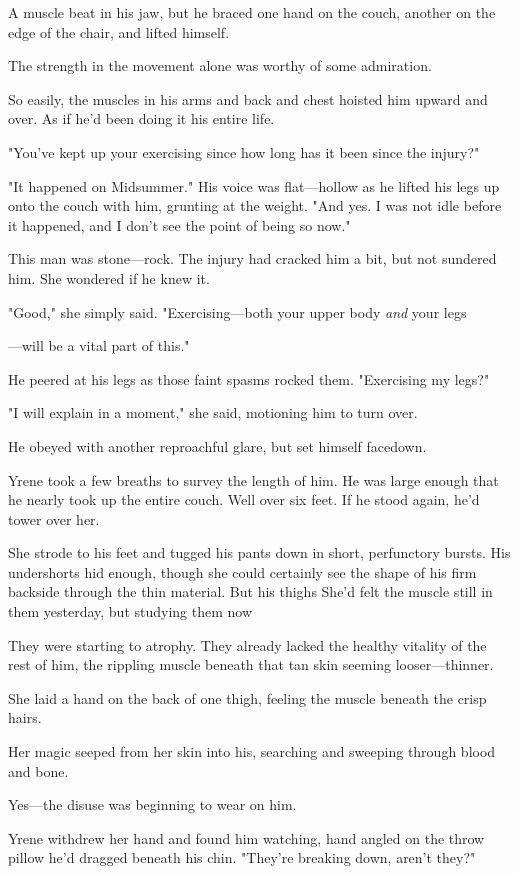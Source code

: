 A muscle beat in his jaw, but he braced one hand on the couch, another on the edge of the chair, and lifted himself.

The strength in the movement alone was worthy of some admiration.

So easily, the muscles in his arms and back and chest hoisted him upward and over. As if he'd been doing it his entire life.

"You've kept up your exercising since  how long has it been since the injury?"

"It happened on Midsummer." His voice was flat---hollow as he lifted his legs up onto the couch with him, grunting at the weight. "And yes. I was not idle before it happened, and I don't see the point of being so now."

This man was stone---rock. The injury had cracked him a bit, but not sundered him. She wondered if he knew it.

"Good," she simply said. "Exercising---both your upper body
\emph{and} your legs

---will be a vital part of this."

He peered at his legs as those faint spasms rocked them. "Exercising my legs?"

"I will explain in a moment," she said, motioning him to turn over.

He obeyed with another reproachful glare, but set himself facedown.

Yrene took a few breaths to survey the length of him. He was large enough that he nearly took up the entire couch. Well over six feet. If he stood again, he'd tower over her.

She strode to his feet and tugged his pants down in short, perfunctory bursts. His undershorts hid enough, though she could certainly see the shape of his firm backside through the thin material. But his thighs
 She'd felt the muscle still in them yesterday, but studying them now 

They were starting to atrophy. They already lacked the healthy vitality of the rest of him, the rippling muscle beneath that tan skin seeming looser---thinner.

She laid a hand on the back of one thigh, feeling the muscle beneath the crisp hairs.

Her magic seeped from her skin into his, searching and sweeping through blood and bone.

Yes---the disuse was beginning to wear on him.

Yrene withdrew her hand and found him watching, hand angled on the throw pillow he'd dragged beneath his chin. "They're breaking down, aren't they?"

